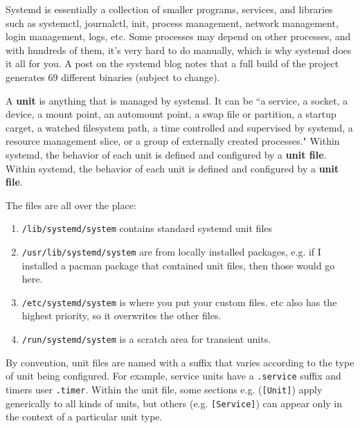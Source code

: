 \documentclass{article}
\begin{document}
  Systemd is essentially a collection of smaller programs, services, and libraries such as systemctl, journalctl, init, process management, network management, login management, logs, etc. Some processes may depend on other processes, and with hundreds of them, it's very hard to do manually, which is why systemd does it all for you. A post on the systemd blog notes that a full build of the project generates 69 different binaries (subject to change). 

  \begin{definition}
    A \textbf{unit} is anything that is managed by systemd. It can be ``a service, a socket, a device, a mount point, an automount point, a swap file or partition, a startup carget, a watched filesystem path, a time controlled and supervised by systemd, a resource management slice, or a group of externally created processes." Within systemd, the behavior of each unit is defined and configured by a \textbf{unit file}. Within systemd, the behavior of each unit is defined and configured by a \textbf{unit file}. 

    The files are all over the place: 
      \begin{enumerate}
        \item \texttt{/lib/systemd/system} contains standard systemd unit files 
        \item \texttt{/usr/lib/systemd/system} are from locally installed packages, e.g. if I installed a pacman package that contained unit files, then those would go here. 
        \item \texttt{/etc/systemd/system} is where you put your custom files. etc also has the highest priority, so it overwrites the other files.  
        \item \texttt{/run/systemd/system} is a scratch area for transient units. 
      \end{enumerate}

    By convention, unit files are named with a suffix that varies according to the type of unit being configured. For example, service units have a \texttt{.service} suffix and timers user \texttt{.timer}. Within the unit file, some sections e.g. (\texttt{[Unit]}) apply generically to all kinds of units, but others (e.g. \texttt{[Service]}) can appear only in the context of a particular unit type. 

  \end{definition}
\end{document}
